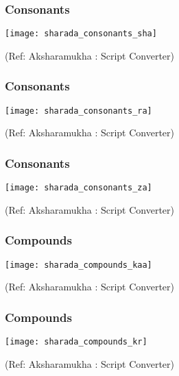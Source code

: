 \begin{frame}[fragile]\frametitle{Consonants}

	\begin{center}
	\texttt{[image: sharada\_consonants\_sha]} 
	
	{\tiny (Ref: Aksharamukha : Script Converter)}
	\end{center}	

\end{frame}

\begin{frame}[fragile]\frametitle{Consonants}

	\begin{center}
	\texttt{[image: sharada\_consonants\_ra]} 
	
	{\tiny (Ref: Aksharamukha : Script Converter)}
	\end{center}	

\end{frame}

\begin{frame}[fragile]\frametitle{Consonants}

	\begin{center}
	\texttt{[image: sharada\_consonants\_za]} 
	
	{\tiny (Ref: Aksharamukha : Script Converter)}
	\end{center}	

\end{frame}

\begin{frame}[fragile]\frametitle{Compounds}

	\begin{center}
	\texttt{[image: sharada\_compounds\_kaa]} 
	
	{\tiny (Ref: Aksharamukha : Script Converter)}
	\end{center}	

\end{frame}

\begin{frame}[fragile]\frametitle{Compounds}

	\begin{center}
	\texttt{[image: sharada\_compounds\_kr]} 
	
	{\tiny (Ref: Aksharamukha : Script Converter)}
	\end{center}	

\end{frame}

